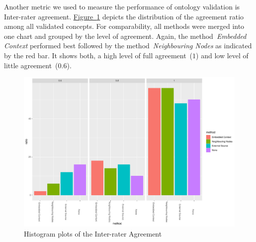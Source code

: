 Another metric we used to measure the performance of ontology validation is Inter-rater agreement. 
\hyperref[fig:hist_agreement_finance_all]{Figure~\ref*{fig:hist_agreement_finance_all}} depicts the distribution of the agreement ratio among all validated concepts. For comparability, all methods were merged into one chart and grouped by the level of agreement. Again, the method~\emph{Embedded Context} performed best followed by the method~\emph{Neighbouring Nodes} as indicated by the red bar. It shows both, a high level of full agreement~($1$) and low level of little agreement~($0.6$). 
\begin{figure}
  	 \includegraphics[width=\textwidth]{plots/finance/hist_agreement}
  	 \caption{Histogram plots of the Inter-rater Agreement}\label{fig:hist_agreement_finance_all}
\end{figure}


